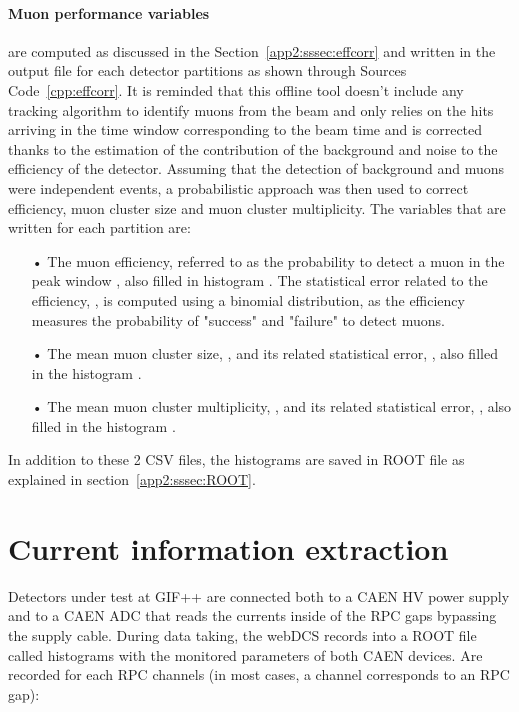 	\paragraph{Muon performance variables} are computed as discussed in the Section~\ref{app2:sssec:effcorr} and written in the output file for each detector partitions as shown through Sources Code~\ref{cpp:effcorr}. It is reminded that this offline tool doesn't include any tracking algorithm to identify muons from the beam and only relies on the hits arriving in the time window corresponding to the beam time and is corrected thanks to the estimation of the contribution of the background and noise to the efficiency of the detector. Assuming that the detection of background and muons were independent events, a probabilistic approach was then used to correct efficiency, muon cluster size and muon cluster multiplicity. The variables that are written for each partition are:
	
	\begin{itemize}
		\item[•] The muon efficiency, referred to as the probability to detect a muon in the peak window , also filled in histogram . The statistical error related to the efficiency, , is computed using a binomial distribution, as the efficiency measures the probability of "success" and "failure" to detect muons.
		\item[•] The mean muon cluster size, , and its related statistical error, , also filled in the histogram .
		\item[•] The mean muon cluster multiplicity, , and its related statistical error, , also filled in the histogram .
	\end{itemize}
	
	In addition to these 2 CSV files, the histograms are saved in ROOT file  as explained in section~\ref{app2:sssec:ROOT}.

\section{Current information extraction}
\label{app2:sec:currents}

	Detectors under test at GIF++ are connected both to a CAEN HV power supply and to a CAEN ADC that reads the currents inside of the RPC gaps bypassing the supply cable. During data taking, the webDCS records into a ROOT file called  histograms with the monitored parameters of both CAEN devices. Are recorded for each RPC channels (in most cases, a channel corresponds to an RPC gap):
	
